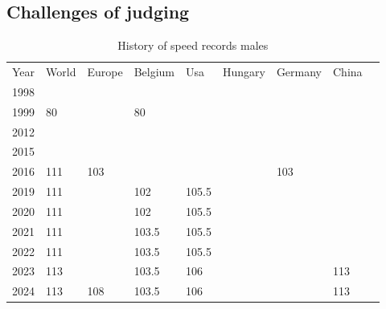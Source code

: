\subsection{Challenges of judging}
\label{subsubsec:literature-judge-challenges}

\begin{table}[]
    \begin{tabular}{lllllllll}
        Year & World & Europe & Belgium & Usa   & Hungary & Germany & China \\
        1998 &       &        &         &       &         &         &       \\
        1999 & 80    &        & 80      &       &         &         &       \\
        2012 &       &        &         &       &         &         &       \\
        2015 &       &        &         &       &         &         &       \\
        2016 & 111   & 103    &         &       &         & 103     &       \\
        2019 & 111   &        & 102     & 105.5 &         &         &       \\
        2020 & 111   &        & 102     & 105.5 &         &         &       \\
        2021 & 111   &        & 103.5   & 105.5 &         &         &       \\
        2022 & 111   &        & 103.5   & 105.5 &         &         &       \\
        2023 & 113   &        & 103.5   & 106   &         &         & 113   \\
        2024 & 113   & 108    & 103.5   & 106   &         &         & 113
    \end{tabular}
    \caption{History of speed records males}
    \label{tbl:speed-records-male}
\end{table}


